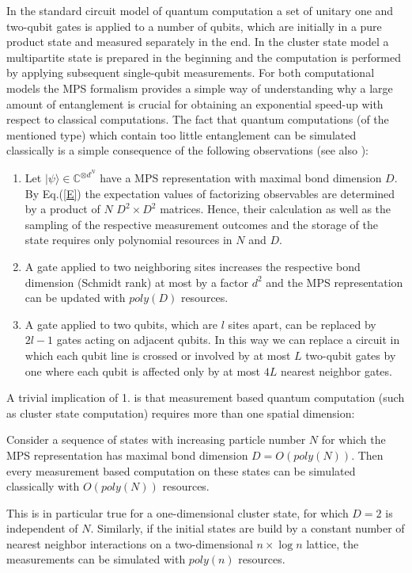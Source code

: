 \documentclass[aps,prl,epsfig,graphics,floatfix,mathbbm,a4paper]{article}
\newcommand{\1}{\mathbbm{1}}
\renewcommand{\>}{\rangle}
\newcommand{\<}{\langle}
\begin{document}
In the standard circuit model of quantum computation a set of
unitary one and two-qubit gates is applied to a number of qubits,
which are initially in a pure product state and measured
separately in the end. In the cluster state model a multipartite
state is prepared in the beginning and the computation is
performed by applying subsequent single-qubit measurements. For
both computational models the MPS formalism provides a simple way
of understanding why a large amount of entanglement is crucial for
obtaining an exponential speed-up with respect to classical
computations. The fact that quantum computations (of the mentioned
type) which contain too little entanglement can be simulated
classically is a simple consequence of the following observations
(see also \cite{Jozsa}):
\begin{enumerate}
    \item Let $|\psi\rangle\in \mathbb{C}^{\otimes d^N}$ have a MPS representation
          with maximal bond dimension $D$. By Eq.(\ref{E}) the expectation values of factorizing
          observables are determined by a product of $N$ $D^2\times D^2$
          matrices. Hence, their calculation as well as the sampling of the respective
          measurement outcomes and the storage of
          the state requires only polynomial resources in $N$ and $D$.
    \item A gate applied to two neighboring sites increases the
          respective bond dimension (Schmidt rank) at most by a factor
          $d^2$ and the MPS representation can be updated with $poly(D)$
          resources.
    \item A gate applied to two qubits, which are $l$ sites apart,
          can be replaced by $2l-1$ gates acting on adjacent qubits. In
          this way we can replace a circuit in which each qubit line is
          crossed or involved by at most $L$ two-qubit gates by one
          where each qubit is affected only by at most $4 L$ nearest
          neighbor gates.
\end{enumerate}
A trivial implication of 1. is that measurement based quantum
computation (such as cluster state computation) requires more than
one spatial dimension:
\begin{theorem} \label{Thm:ClusterComputation}
    Consider a sequence of states with increasing particle number $N$
    for which the MPS representation has maximal bond dimension
    $D=O(poly(N))$. Then every measurement based computation on these
    states can be simulated classically with $O(poly(N))$ resources.
\end{theorem}
This is in particular true for a one-dimensional cluster state,
for which $D=2$ is independent of $N$. Similarly, if the initial
states are build by a constant number of nearest neighbor
interactions on a two-dimensional $n\times \log n$ lattice, the
measurements can be simulated with $poly(n)$ resources.
\end{document}
